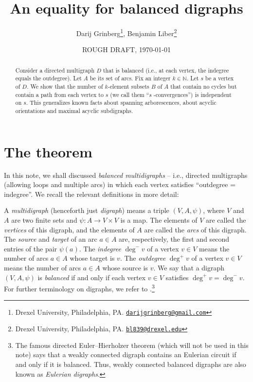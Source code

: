 \documentclass[numbers=enddot,12pt,final,onecolumn,notitlepage]{scrartcl}%
\theoremstyle{definition}
\theoremstyle{plainsl}
\begin{document}
\title{An equality for balanced digraphs}
\author{Darij Grinberg\thanks{Drexel University, Philadelphia, PA.
\href{mailto:darijgrinberg@gmail.com}{\texttt{darijgrinberg@gmail.com}}},
Benjamin Liber\thanks{Drexel University, Philadelphia, PA.
\href{mailto:bl839@drexel.edu}{\texttt{bl839@drexel.edu}}}}
\date{ROUGH DRAFT, \today}
\maketitle

\begin{abstract}
Consider a directed multigraph $D$ that is balanced (i.e., at each vertex, the
indegree equals the outdegree). Let $A$ be its set of arcs. Fix an integer
$k\in\mathbb{N}$. Let $s$ be a vertex of $D$. We show that the number of
$k$-element subsets $B$ of $A$ that contain no cycles but contain a path from
each vertex to $s$ (we call them \textquotedblleft$s$%
-convergences\textquotedblright) is independent on $s$. This generalizes known
facts about spanning arborescences, about acyclic orientations and maximal
acyclic subdigraphs.

\end{abstract}

\section{The theorem}

In this note, we shall discussed \emph{balanced multidigraphs} -- i.e.,
directed multigraphs (allowing loops and multiple arcs) in which each vertex
satisfies \textquotedblleft outdegree = indegree\textquotedblright. We recall
the relevant definitions in more detail:

A \emph{multidigraph} (henceforth just \emph{digraph}) means a triple
$(V,A,\psi)$, where $V$ and $A$ are two finite sets and $\psi: A \to V \times
V$ is a map. The elements of $V$ are called the \emph{vertices} of this
digraph, and the elements of $A$ are called the \emph{arcs} of this digraph.
The \emph{source} and \emph{target} of an arc $a \in A$ are, respectively, the
first and second entries of the pair $\psi(a)$. The \emph{indegree} $\deg
^{-}v$ of a vertex $v \in V$ means the number of arcs $a \in A$ whose target
is $v$. The \emph{outdegree} $\deg^{+}v$ of a vertex $v \in V$ means the
number of arcs $a \in A$ whose source is $v$. We say that a digraph
$(V,A,\psi)$ is \emph{balanced} if and only if each vertex $v \in V$ satisfies
$\deg^{+}v = \deg^{-}v$. For further terminology on digraphs, we refer to
\cite{22s}.\footnote{The famous directed Euler--Hierholzer theorem (which will
not be used in this note) says that a weakly connected digraph contains an
Eulerian circuit if and only if it is balanced. Thus, weakly connected
balanced digraphs are also known as \emph{Eulerian digraphs}.}
\end{document}
